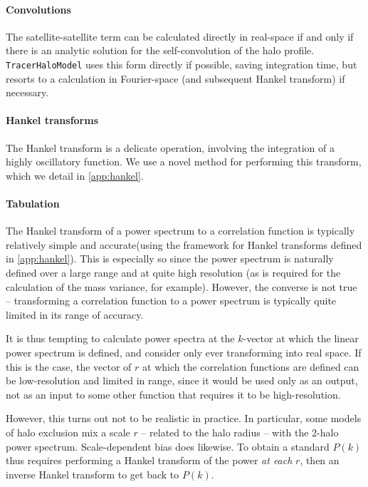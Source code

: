 \documentclass[5p,aas_macros]{elsarticle}
\begin{document}
\paragraph*{Convolutions}
The satellite-satellite term can be calculated directly in real-space if and only if there is an analytic solution for the self-convolution of the halo profile. \verb|TracerHaloModel| uses this form directly if possible, saving integration time, but resorts to a calculation in Fourier-space (and subsequent Hankel transform) if necessary. 

\paragraph*{Hankel transforms} 
The Hankel transform is a delicate operation, involving the integration of a highly oscillatory function. We use a novel method for performing this transform, which we detail in \ref{app:hankel}.

\paragraph*{Tabulation}
The Hankel transform of a power spectrum to a correlation function is typically relatively simple and accurate(using the framework for Hankel transforms defined in \ref{app:hankel}).
This is especially so since the power spectrum is naturally defined over a large range and at quite high resolution (as is required for the calculation of the mass variance, for example). 
However, the converse is not true -- transforming a correlation function to a power spectrum is typically quite limited in its range of accuracy. 

It is thus tempting to calculate power spectra at the $k$-vector at which the linear power spectrum is defined, and consider only ever transforming into real space. If this is the case, the vector of $r$ at which the correlation functions are defined can be low-resolution and limited in range, since it would be used only as an output, not as an input to some other function that requires it to be high-resolution.

However, this turns out not to be realistic in practice. 
In particular, some models of halo exclusion mix a scale $r$ -- related to the halo radius -- with the 2-halo power spectrum. Scale-dependent bias does likewise. To obtain a standard $P(k)$ thus requires performing a Hankel transform of the power \textit{at each} $r$, then an inverse Hankel transform to get back to $P(k)$. 
\end{document}

